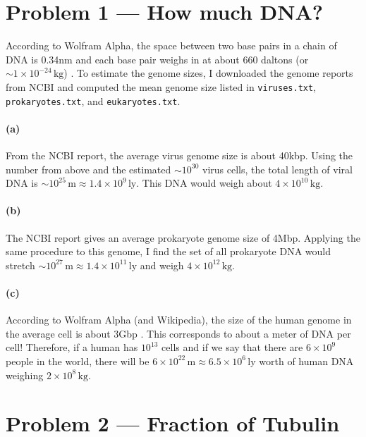 \documentclass[11pt]{article}
\newcommand{\unit}[1]{\ensuremath{\,\mathrm{#1}}}
\begin{document}
\section{Problem 1 --- How much DNA?}

According to Wolfram Alpha, the space between two base pairs in a chain of DNA
is 0.34nm and each base pair weighs in at about 660 daltons (or
$\sim1\times10^{-24}\unit{kg}$) \cite{bp-wa}.
To estimate the genome sizes, I downloaded the genome reports from NCBI
\cite{genome-reports} and computed the mean genome size listed in
\texttt{viruses.txt}, \texttt{prokaryotes.txt}, and \texttt{eukaryotes.txt}.

\paragraph{(a)}
From the NCBI report, the average virus genome size is about 40kbp.
Using the number from above and the estimated $\sim10^{30}$ virus cells, the
total length of viral DNA is $\sim10^{25}\unit{m} \approx
1.4\times10^9\unit{ly}$.
This DNA would weigh about $4\times10^{10}\unit{kg}$.

\paragraph{(b)}
The NCBI report gives an average prokaryote genome size of 4Mbp.
Applying the same procedure to this genome, I find the set of all prokaryote
DNA would stretch $\sim10^{27}\unit{m} \approx 1.4\times10^{11}\unit{ly}$ and
weigh $4\times10^{12}\unit{kg}$.

\paragraph{(c)}

According to Wolfram Alpha (and Wikipedia), the size of the human genome in
the average cell is about 3Gbp \cite{human-genome-wa}.
This corresponds to about a meter of DNA per cell!
Therefore, if a human has $10^{13}$ cells and if we say that there are
$6\times10^9$ people in the world, there will be $6\times10^{22}\unit{m}
\approx 6.5\times10^6\unit{ly}$ worth of human DNA weighing
$2\times10^8\unit{kg}$.


\section{Problem 2 --- Fraction of Tubulin}
\end{document}
